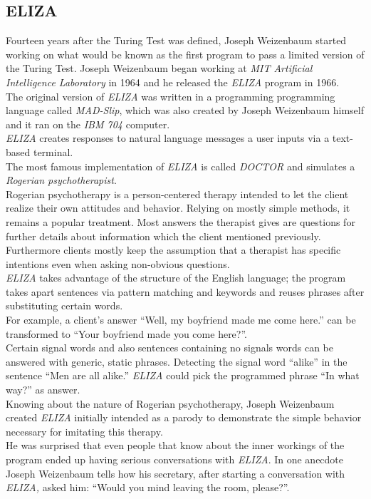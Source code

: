 \subsection{ELIZA}

Fourteen years after the Turing Test was defined, Joseph Weizenbaum started working on what would be known as the first program to pass a limited version of the Turing Test.
Joseph Weizenbaum began working at \emph{MIT Artificial Intelligence Laboratory} in 1964 and he released the \emph{ELIZA} program in 1966.
\\

The original version of \emph{ELIZA} was written in a programming programming language called \emph{MAD-Slip},
which was also created by Joseph Weizenbaum himself and it ran on the \emph{IBM 704} computer.
\\
\emph{ELIZA} creates responses to natural language messages a user inputs via a text-based terminal.
\\

The most famous implementation of \emph{ELIZA} is called \emph{DOCTOR} and simulates a \emph{Rogerian psychotherapist}.
\\
Rogerian psychotherapy is a person-centered therapy intended to let the client realize their own attitudes and behavior.
Relying on mostly simple methods, it remains a popular treatment.
Most answers the therapist gives are questions for further details about information which the client mentioned previously.
Furthermore clients mostly keep the assumption that a therapist has specific intentions even when asking non-obvious questions.
\\

\emph{ELIZA} takes advantage of the structure of the English language;
the program takes apart sentences via pattern matching and keywords and reuses phrases after substituting certain words.
\\
For example, a client's answer ``Well, my boyfriend made me come here.'' can be transformed to ``Your boyfriend made you come here?''\cite{elizatest}.
\\
Certain signal words and also sentences containing no signals words can be answered with generic, static phrases.
Detecting the signal word ``alike'' in the sentence ``Men are all alike.'' \emph{ELIZA} could pick the programmed phrase ``In what way?'' as answer\cite{elizatest}.
\\

Knowing about the nature of Rogerian psychotherapy, Joseph Weizenbaum created \emph{ELIZA} initially intended as a parody to demonstrate the simple behavior necessary for imitating this therapy.
\\
He was surprised that even people that know about the inner workings of the program ended up having serious conversations with \emph{ELIZA}.
In one anecdote Joseph Weizenbaum tells how his secretary, after starting a conversation with \emph{ELIZA,} asked him: ``Would you mind leaving the room, please?''\cite[5]{weizenbaum}.
\\

